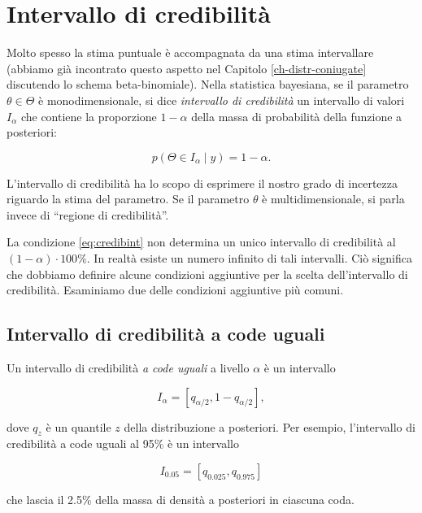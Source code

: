 \documentclass[
  11pt,
]{krantz}
\theoremstyle{definition}
\theoremstyle{definition}
\theoremstyle{definition}
\theoremstyle{definition}
\theoremstyle{remark}
\begin{document}
\hypertarget{intervallo-di-credibilituxe0}{%
\section{Intervallo di credibilità}\label{intervallo-di-credibilituxe0}}

Molto spesso la stima puntuale è accompagnata da una stima intervallare (abbiamo già incontrato questo aspetto nel Capitolo \ref{ch-distr-coniugate} discutendo lo schema beta-binomiale). Nella statistica bayesiana, se il parametro \(\theta \in \Theta\) è monodimensionale, si dice \emph{intervallo di credibilità} un intervallo di valori \(I_{\alpha}\) che contiene la proporzione \(1 - \alpha\) della massa di probabilità della funzione a posteriori:

\begin{equation}
p(\Theta \in I_{\alpha} \mid y) = 1 - \alpha.
\label{eq:credibint}
\end{equation}

L'intervallo di credibilità ha lo scopo di esprimere il nostro grado di incertezza riguardo la stima del parametro. Se il parametro \(\theta\) è multidimensionale, si parla invece di ``regione di credibilità''.

La condizione \eqref{eq:credibint} non determina un unico intervallo di credibilità al \((1 - \alpha) \cdot 100\%\). In realtà esiste un numero infinito di tali intervalli. Ciò significa che dobbiamo definire alcune condizioni aggiuntive per la scelta dell'intervallo di credibilità. Esaminiamo due delle condizioni aggiuntive più comuni.

\hypertarget{intervallo-di-credibilituxe0-a-code-uguali}{%
\subsection{Intervallo di credibilità a code uguali}\label{intervallo-di-credibilituxe0-a-code-uguali}}

Un intervallo di credibilità \emph{a code uguali} a livello \(\alpha\) è un intervallo

\[
I_{\alpha} = [q_{\alpha/2}, 1 - q_{\alpha/2}],
\]

dove \(q_z\) è un quantile \(z\) della distribuzione a posteriori. Per esempio, l'intervallo di credibilità a code uguali al 95\% è un intervallo

\[
I_{0.05} = [q_{0.025}, q_{0.975}]
\]

che lascia il 2.5\% della massa di densità a posteriori in ciascuna coda.
\end{document}
